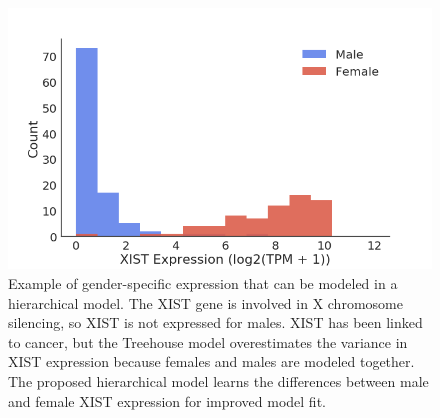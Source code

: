 \documentclass[fleqn,10pt]{wlscirep}
\begin{document}

\begin{figure}
\centering
\includegraphics[width=0.75\linewidth]{images/xist-fig-2017-12-28.png}
\caption{Example of gender-specific expression that can be modeled in a hierarchical model. The XIST gene is involved in X chromosome silencing, so XIST is not expressed for males. XIST has been linked to cancer, but the Treehouse model overestimates the variance in XIST expression because females and males are modeled together. The proposed hierarchical model learns the differences between male and female XIST expression for improved model fit.}
\label{sfig:xist}
\end{figure}
\end{document}
